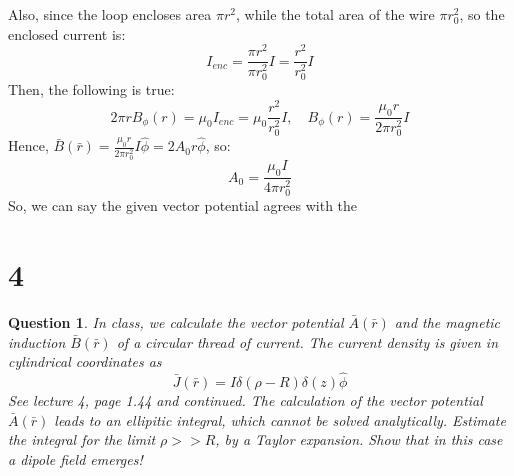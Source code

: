 \documentclass{article}
\newtheorem{question}{Question}
\begin{document}
Also, since the loop encloses area $\pi r^2$, while the total area of the wire $\pi r_{0}^2$, so the enclosed current is:
$$I_{enc}=\frac{\pi r^2}{\pi r_0^2}I = \frac{r^2}{r_0^2}I$$
Then, the following is true:
$$2\pi rB_\phi(r)=\mu_0 I_{enc}=\mu_0\frac{r^2}{r_0^2}I,\quad B_\phi(r)=\frac{\mu_0r}{2\pi r_0^2}I$$
Hence, $\bar{B}(\bar{r})=\frac{\mu_0r}{2\pi r_0^2}I\hat{\phi}=2A_0r\hat{\phi}$, so: 
$$A_0 = \frac{\mu_0I}{4\pi r_0^2}$$
So, we can say the given vector potential agrees with the 

\break

\section*{4}
\begin{myBox}[]{}
    \begin{question}
        In class, we calculate the vector potential $\bar{A}(\bar{r})$ and the magnetic induction $\bar{B}(\bar{r})$ of a circular
        thread of current. The current density is given in cylindrical coordinates as
        $$\bar{J}(\bar{r})=I\delta(\rho-R)\delta(z)\hat{\phi}$$
        See lecture 4, page 1.44 and continued. The calculation of the vector potential $\bar{A}(\bar{r})$ leads to
        an ellipitic integral, which cannot be solved analytically. Estimate the integral for the limit
        $\rho>> R$, by a Taylor expansion. Show that in this case a dipole field emerges!

    \end{question}
\end{myBox}
\end{document}
